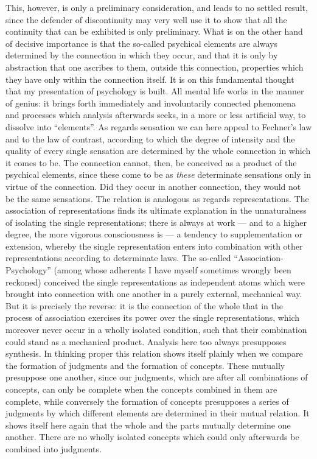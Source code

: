 \documentclass[12pt,a4paper]{book}
\newcommand{\opage}[1]{\marginnote{\footnotesize\textit{[#1]}}}
\begin{document}
This, however, is only a preliminary consideration, and leads to no settled
result, since the defender of discontinuity may very well use it to show that
all the continuity that can be exhibited is only preliminary. What is on the
other hand of decisive importance is that the so-called psychical elements are
always determined by the connection in which they occur, and that it is only by
abstraction that one ascribes to them, outside this connection, properties which
they have only within the connection itself. It is on this fundamental thought
that my presentation of psychology is built. All mental life works in the manner
of genius: it brings forth immediately and involuntarily connected phenomena and
processes which analysis afterwards seeks, in a more or less artificial way, to
dissolve into ``elements''. As regards sensation we can here appeal to Fechner's
law and to the law of contrast, according to which the degree of intensity and
the quality of every single sensation are determined by \opage{9}the whole connection in
which it comes to be. The connection cannot, then, be conceived as a product of
the psychical elements, since these come to be as \emph{these} determinate
sensations only in virtue of the connection. Did they occur in another
connection, they would not be the same sensations. The relation is analogous as
regards representations. The association of representations finds its ultimate
explanation in the unnaturalness of isolating the single representations; there
is always at work --- and to a higher degree, the more vigorous consciousness is
--- a tendency to supplementation or extension, whereby the single
representation enters into combination with other representations according to
determinate laws. The so-called ``Association-Psychology'' (among whose adherents
I have myself sometimes wrongly been reckoned) conceived the single
representations as independent atoms which were brought into connection with one
another in a purely external, mechanical way. But it is precisely the reverse:
it is the connection of the whole that in the process of association exercises
its power over the single representations, which moreover never occur in a
wholly isolated condition, such that their combination could stand as a
mechanical product. Analysis here too always presupposes synthesis. In thinking
proper this relation shows itself plainly when we compare the formation of
judgments and the formation of concepts. These mutually presuppose one another,
since our judgments, which are after all combinations of concepts, can only be
complete when the concepts combined in them are complete, while conversely the
formation of concepts presupposes a series of judgments by which different
elements are determined in their mutual relation. It shows itself here again
that the whole and the parts mutually determine one another. There are no wholly
isolated concepts which could only afterwards be combined into judgments.
\end{document}
